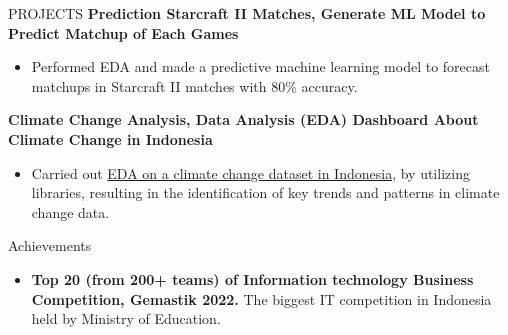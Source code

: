 \documentclass{resume} %
\begin{document}
\begin{rSection}{PROJECTS}
{\bf Prediction Starcraft II Matches, Generate ML Model to Predict Matchup of Each Games}
\vspace{-0.75em}
\begin{itemize}
\itemsep -7pt {}
\item Performed EDA and made a predictive machine learning model to forecast matchups in Starcraft II matches with 80\% accuracy.
 \end{itemize}
 \vspace{-0.5em}

{\bf Climate Change Analysis, Data Analysis (EDA) Dashboard About Climate Change in Indonesia}
\vspace{-0.75em}
\begin{itemize}
\itemsep -7pt {}
\item Carried out \href{https://nafisazizir-tetrisprogram-dashboard-eup8c6.streamlit.app/}{EDA on a climate change dataset in Indonesia}, by utilizing libraries, resulting in the identification of key trends and patterns in climate change data.
 \end{itemize}
 \vspace{-0.5em}


\end{rSection} 

\begin{rSection}{Achievements}

\begin{itemize}
\itemsep -7pt {}
\item \textbf{Top 20 (from 200+ teams) of Information technology Business Competition, Gemastik 2022.} The biggest IT competition in Indonesia held by Ministry of Education.
 \end{itemize}
 \vspace{-0.5em}


\end{rSection}
\end{document}

